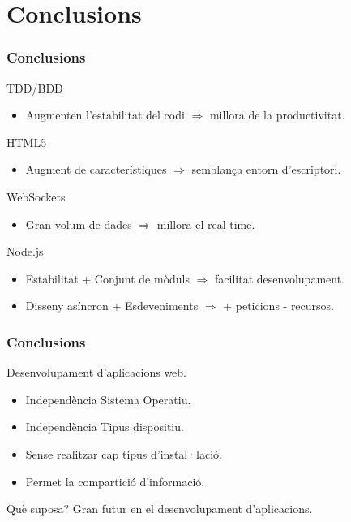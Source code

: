 \documentclass[notitlepage]{beamer}
\begin{document}
\section{Conclusions}
\begin{frame}
\frametitle{Conclusions}
\begin{block}{TDD/BDD}
\begin{itemize}
\item{Augmenten l'estabilitat del codi $\Rightarrow$ millora de la productivitat.}
\end{itemize}
\end{block}

\begin{block}{HTML5}
\begin{itemize}
\item{Augment de característiques $\Rightarrow$ semblança entorn d'escriptori.}
\end{itemize}
\end{block}

\begin{block}{WebSockets}
\begin{itemize}
\item{Gran volum de dades  $\Rightarrow$ millora el real-time.}
\end{itemize}
\end{block}

\begin{block}{Node.js}
\begin{itemize}
\item{Estabilitat + Conjunt de mòduls $\Rightarrow$ facilitat desenvolupament.}
\item{Disseny asíncron + Esdeveniments $\Rightarrow$ + peticions - recursos.}
\end{itemize}
\end{block}
\end{frame}


\begin{frame}
\frametitle{Conclusions}
\begin{block}{Desenvolupament d'aplicacions web.}
\begin{itemize}
\item{Independència Sistema Operatiu.}
\item{Independència Tipus dispositiu.}
\item{Sense realitzar cap tipus d'instal·lació.}
\item{Permet la compartició d'informació.}
\end{itemize}
\end{block}

\begin{block}{Què suposa?}
Gran futur en el desenvolupament d'aplicacions.
\end{block}
\end{frame}
\end{document}
